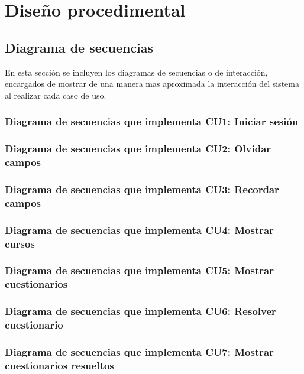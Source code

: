 
\section{Diseño procedimental}

\subsection{Diagrama de secuencias}

En esta sección se incluyen los diagramas de secuencias o de interacción, encargados de mostrar de una manera mas aproximada la interacción del sistema al realizar cada caso de uso.

\subsubsection{Diagrama de secuencias que implementa CU1: Iniciar sesión}


\subsubsection{Diagrama de secuencias que implementa CU2: Olvidar campos}

\subsubsection{Diagrama de secuencias que implementa CU3: Recordar campos}

\subsubsection{Diagrama de secuencias que implementa CU4: Mostrar cursos}

\subsubsection{Diagrama de secuencias que implementa CU5: Mostrar cuestionarios}

\subsubsection{Diagrama de secuencias que implementa CU6: Resolver cuestionario}

\subsubsection{Diagrama de secuencias que implementa CU7: Mostrar cuestionarios resueltos}

